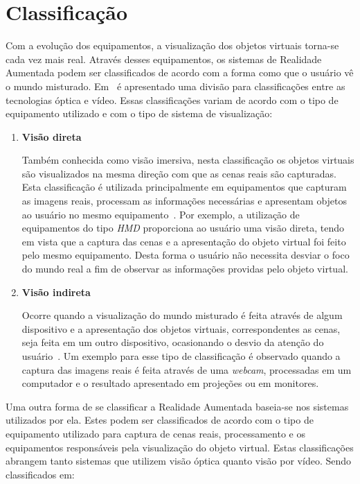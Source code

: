 \section{Classificação}
\label{sec:classificacao}
	
	Com a evolução dos equipamentos, a visualização dos objetos virtuais torna-se cada vez mais real.
	Através desses equipamentos, os sistemas de Realidade Aumentada podem ser classificados de acordo
	com a forma como que o usuário vê o mundo misturado. Em~\cite{ronaldAzuma} é apresentado uma
	divisão para classificações entre as tecnologias óptica e vídeo. Essas classificações variam de
	acordo com o tipo de equipamento utilizado e com o tipo de sistema de visualização:
	
	\begin{enumerate}
		\item \textbf{Visão direta}
		
		Também conhecida como visão imersiva, nesta classificação os objetos virtuais são visualizados
		na mesma direção com que as cenas reais são capturadas. Esta classificação é utilizada
		principalmente em equipamentos que capturam as imagens reais, processam as informações
		necessárias e apresentam objetos ao usuário no mesmo equipamento~\cite{suthau}. Por
		exemplo, a utilização de equipamentos do tipo \textit{HMD} proporciona ao usuário uma visão
		direta, tendo em vista que a captura das cenas e a apresentação do objeto virtual foi feito pelo
		mesmo equipamento. Desta forma o usuário não necessita desviar o foco do mundo real a fim de
		observar as informações providas pelo objeto virtual.
		
		
		\item \textbf{Visão indireta}
		
		Ocorre quando a visualização do mundo misturado é feita através de algum dispositivo e a
		apresentação dos objetos virtuais, correspondentes as cenas, seja feita em um outro dispositivo,
		ocasionando o desvio da atenção do usuário~\cite{suthau, kernerTori}. Um exemplo para
		esse tipo de classificação é observado quando a captura das imagens reais é feita através de uma
		\textit{webcam}, processadas em um computador e o resultado apresentado em projeções ou em
		monitores.
		
	\end{enumerate}
	
	Uma outra forma de se classificar a Realidade Aumentada baseia-se nos sistemas utilizados por ela.
	Estes podem ser classificados de acordo com o tipo de equipamento utilizado para captura de cenas
	reais, processamento e os equipamentos responsáveis pela visualização do objeto virtual. Estas
	classificações abrangem tanto sistemas que utilizem visão óptica quanto visão por vídeo. Sendo
	classificados em:
		
